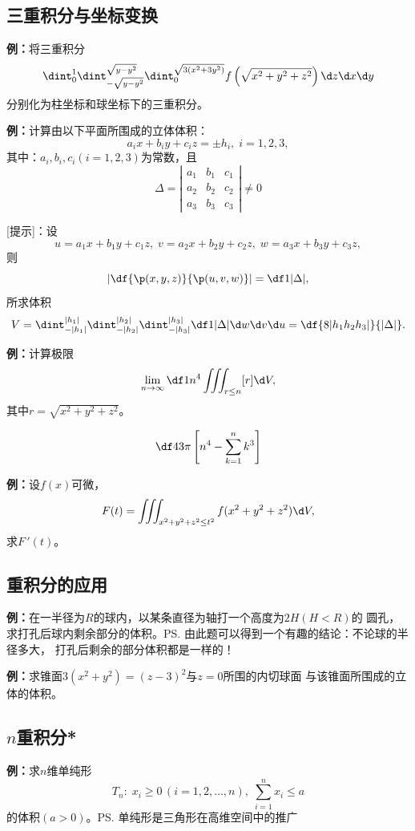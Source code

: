 \subsection{三重积分与坐标变换}

{\bf 例：}将三重积分
$$\dint_0^1\dint_{-\sqrt{y-y^2}}^{\sqrt{y-y^2}}
\dint_0^{\sqrt{3(x^2+3y^2)}}f\left(
\sqrt{x^2+y^2+z^2}\right)\d z\d x\d y$$
分别化为柱坐标和球坐标下的三重积分。

{\bf 例：}计算由以下平面所围成的立体体积：
$$a_ix+b_iy+c_iz=\pm h_i,\;i=1,2,3,$$
其中：$a_i,b_i,c_i(i=1,2,3)$为常数，且
$$\Delta=\left|\begin{array}{ccc}
a_1 & b_1 & c_1\\ a_2 & b_2 & c_2 \\ a_3 & b_3 & c_3
\end{array}\right|\ne 0$$

[提示]：设
$$u=a_1x+b_1y+c_1z,\;v=a_2x+b_2y+c_2z,\;w=a_3x+b_3y+c_3z,$$
则
$$\left|\df{\p(x,y,z)}{\p(u,v,w)}\right|=\df1{|\Delta|},$$
所求体积
$$V=\dint_{-|h_1|}^{|h_1|}\dint_{-|h_2|}^{|h_2|}\dint_{-|h_3|}^{|h_3|}
\df1{|\Delta|}\d w\d v\d u=\df{8|h_1h_2h_3|}{|\Delta|}.$$

{\bf 例：}计算极限
$$\lim\limits_{n\to\infty}\df 1{n^4}\iiint_{r\leq n}[r]\d V,$$
其中$r=\sqrt{x^2+y^2+z^2}$。

$${\df 43\pi\left[n^4-\sum\limits_{k=1}^nk^3\right]}$$

{\bf 例：}设$f(x)$可微，
$$F(t)=\iiint_{x^2+y^2+z^2\leq t^2}f(x^2+y^2+z^2)\d V,$$
求$F\,'(t)$。


\subsection{重积分的应用}

{\bf 例：}在一半径为$R$的球内，以某条直径为轴打一个高度为$2H(H<R)$的
圆孔，求打孔后球内剩余部分的体积。\ps{由此题可以得到一个有趣的结论：不论球的半径多大，
打孔后剩余的部分体积都是一样的！}

{\bf 例：}求锥面$3(x^2+y^2)=(z-3)^2$与$z=0$所围的内切球面
与该锥面所围成的立体的体积。

\subsection{$n$重积分*}

{\bf 例：}求$n$维单纯形
$$T_n:\; x_i\geq 0\,(i=1,2,\ldots,n),\;
\sum\limits_{i=1}^nx_i\leq a$$
的体积$(a>0)$。\ps{单纯形是三角形在高维空间中的推广}

